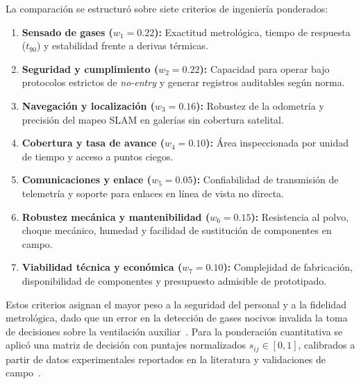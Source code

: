 La comparación se estructuró sobre siete criterios de ingeniería ponderados:
\begin{enumerate}
    \item[a)] \textbf{Sensado de gases ($w_1 = 0.22$):} Exactitud metrológica, tiempo de respuesta ($t_{90}$) y estabilidad frente a derivas térmicas.
    \item[b)] \textbf{Seguridad y cumplimiento ($w_2 = 0.22$):} Capacidad para operar bajo protocolos estrictos de \textit{no-entry} y generar registros auditables según norma.
    \item[c)] \textbf{Navegación y localización ($w_3 = 0.16$):} Robustez de la odometría y precisión del mapeo SLAM en galerías sin cobertura satelital.
    \item[d)] \textbf{Cobertura y tasa de avance ($w_4 = 0.10$):} Área inspeccionada por unidad de tiempo y acceso a puntos ciegos.
    \item[e)] \textbf{Comunicaciones y enlace ($w_5 = 0.05$):} Confiabilidad de transmisión de telemetría y soporte para enlaces en línea de vista no directa.
    \item[f)] \textbf{Robustez mecánica y mantenibilidad ($w_6 = 0.15$):} Resistencia al polvo, choque mecánico, humedad y facilidad de sustitución de componentes en campo.
    \item[g)] \textbf{Viabilidad técnica y económica ($w_7 = 0.10$):} Complejidad de fabricación, disponibilidad de componentes y presupuesto admisible de prototipado.
\end{enumerate}

Estos criterios asignan el mayor peso a la seguridad del personal y a la fidelidad metrológica, dado que un error en la detección de gases nocivos invalida la toma de decisiones sobre la ventilación auxiliar~\cite{MINEM_DS024_2016, EU_ExposureDirective_2020}. Para la ponderación cuantitativa se aplicó una matriz de decisión con puntajes normalizados $s_{ij} \in [0, 1]$, calibrados a partir de datos experimentales reportados en la literatura y validaciones de campo~\cite{AdvancesMining_2023, KimChoi_2025_MineMapping, AdaptiveControl_Mines_2025}.

